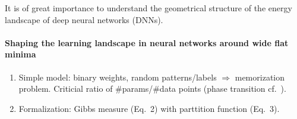 \documentclass{article}
\author{Thomas Hofmann}
\begin{document}
It is of great importance to understand the geometrical structure of the energy landscape of deep neural networks (DNNs). 


\paragraph{Shaping the learning landscape in neural networks around wide flat
  minima \cite{baldassi2019shaping}}

\begin{enumerate}
\item Simple model: binary weights, random patterns/labels $\Rightarrow$ memorization problem. Criticial ratio of \#params/\#data points (phase transition cf.~\cite{krauth1989storage}). 
\item Formalization: Gibbs measure (Eq.~2) with parttition function (Eq.~3).
\end{enumerate}




\end{document}
